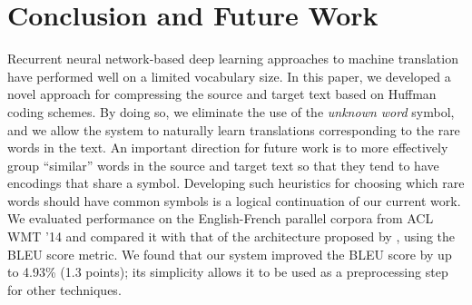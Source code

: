 \section{Conclusion and Future Work}
\label{sec:conclusion}

Recurrent neural network-based deep learning approaches
to machine translation have performed well on a limited vocabulary
size. In this paper, we developed a novel approach for compressing
the source and target text based on Huffman coding schemes. By doing
so, we eliminate the use of the \emph{unknown word} symbol,
and we allow the system to naturally learn translations corresponding
to the rare words in the text. An important direction for future work is to more effectively
group ``similar'' words in the source and target text so that they tend to have
encodings that share a symbol. Developing such heuristics for choosing which rare words should have common symbols
is a logical continuation of our current work. We evaluated performance on the English-French
parallel corpora from ACL WMT '14 and compared it with that of the architecture
proposed by , using the BLEU score metric.
We found that our system improved the BLEU score by up to 4.93\% (1.3 points); its simplicity
allows it to be used as a preprocessing step for other techniques.